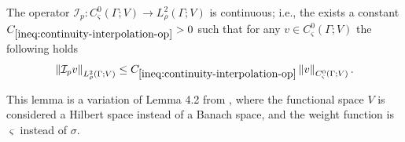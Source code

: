\documentclass[final,onefignum,onetabnum]{mousaviart}
\begin{document}
			
			\vspace*{1mm}
			\begin{lemma}
				\label{lem:continuity-interpolation-op}
				The operator $\mathcal{I}_p:C^0_\varsigma\left( \Gamma; V \right) \rightarrow L^2_\rho\left( \Gamma; V \right)$ is continuous; i.e., the exists a constant $C_{\ref{ineq:continuity-interpolation-op}}>0$ such that for any $v \in C^0_\varsigma\left( \Gamma; V \right)$ the following holds
				\begin{equation}
					\label{ineq:continuity-interpolation-op}
					\left\| \mathcal{I}_p v\right\|_{L_\rho^2(\Gamma; V)} 
					\leq
					C_{\ref{ineq:continuity-interpolation-op}}
					\left\| v \right\|_{C_\varsigma^0(\Gamma; V)}.
				\end{equation}
			\end{lemma}
			
			\vspace*{1mm}
			This lemma is a variation of Lemma 4.2 from \cite{Babuska-Nobile-Tempone}, where the functional space $V$ is considered a Hilbert space instead of a Banach space, and the weight function is $\varsigma$ instead of $\sigma$.
			
\end{document}
